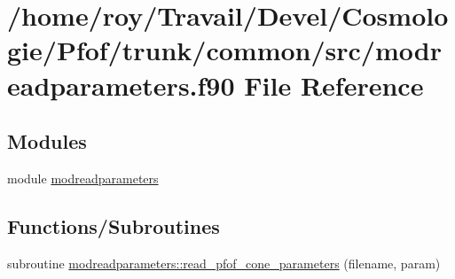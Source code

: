 \hypertarget{modreadparameters_8f90}{}\section{/home/roy/\+Travail/\+Devel/\+Cosmologie/\+Pfof/trunk/common/src/modreadparameters.f90 File Reference}
\label{modreadparameters_8f90}
\subsection*{Modules}
\begin{DoxyCompactItemize}
\item 
module \hyperlink{namespacemodreadparameters}{modreadparameters}
\end{DoxyCompactItemize}
\subsection*{Functions/\+Subroutines}
\begin{DoxyCompactItemize}
\item 
subroutine \hyperlink{namespacemodreadparameters_a04ebe90903c1caa9230d52fe4ab65cf8}{modreadparameters\+::read\+\_\+pfof\+\_\+cone\+\_\+parameters} (filename, param)
\end{DoxyCompactItemize}
